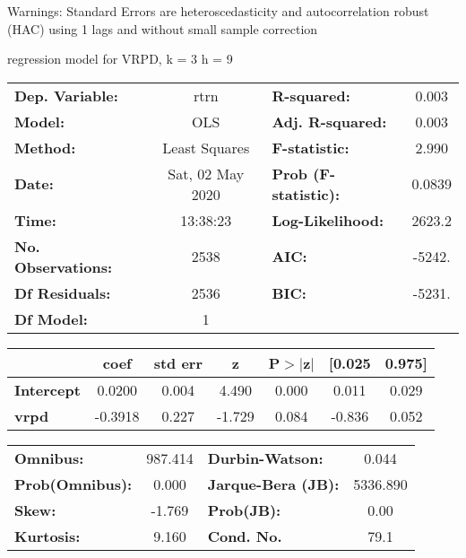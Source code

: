 Warnings: \newline
 [1] Standard Errors are heteroscedasticity and autocorrelation robust (HAC) using 1 lags and without small sample correction\ 

regression model for VRPD, k = 3 h = 9\begin{center}
\begin{tabular}{lclc}
\toprule
\textbf{Dep. Variable:}    &       rtrn       & \textbf{  R-squared:         } &     0.003   \\
\textbf{Model:}            &       OLS        & \textbf{  Adj. R-squared:    } &     0.003   \\
\textbf{Method:}           &  Least Squares   & \textbf{  F-statistic:       } &     2.990   \\
\textbf{Date:}             & Sat, 02 May 2020 & \textbf{  Prob (F-statistic):} &   0.0839    \\
\textbf{Time:}             &     13:38:23     & \textbf{  Log-Likelihood:    } &    2623.2   \\
\textbf{No. Observations:} &        2538      & \textbf{  AIC:               } &    -5242.   \\
\textbf{Df Residuals:}     &        2536      & \textbf{  BIC:               } &    -5231.   \\
\textbf{Df Model:}         &           1      & \textbf{                     } &             \\
\bottomrule
\end{tabular}
\begin{tabular}{lcccccc}
                   & \textbf{coef} & \textbf{std err} & \textbf{z} & \textbf{P$> |$z$|$} & \textbf{[0.025} & \textbf{0.975]}  \\
\midrule
\textbf{Intercept} &       0.0200  &        0.004     &     4.490  &         0.000        &        0.011    &        0.029     \\
\textbf{vrpd}      &      -0.3918  &        0.227     &    -1.729  &         0.084        &       -0.836    &        0.052     \\
\bottomrule
\end{tabular}
\begin{tabular}{lclc}
\textbf{Omnibus:}       & 987.414 & \textbf{  Durbin-Watson:     } &    0.044  \\
\textbf{Prob(Omnibus):} &   0.000 & \textbf{  Jarque-Bera (JB):  } & 5336.890  \\
\textbf{Skew:}          &  -1.769 & \textbf{  Prob(JB):          } &     0.00  \\
\textbf{Kurtosis:}      &   9.160 & \textbf{  Cond. No.          } &     79.1  \\
\bottomrule
\end{tabular}
\end{center}


